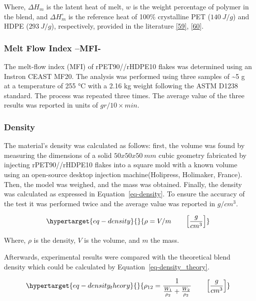 \documentclass[
]{article}
\begin{document}
Where, \(\Delta H_{m}\) is the latent heat of melt, \(w\) is the weight
percentage of polymer in the blend, and \(\Delta H_{m}^\circ\) is the
reference heat of 100\% crystalline PET (\(140~J/g\)) and HDPE
(\(293~J/g\)), respectively, provided in the literature
\protect\hyperlink{ref-pan2020}{{[}59{]}},
\protect\hyperlink{ref-kratofil2006}{{[}60{]}}.

\hypertarget{melt-flow-index-mfi-}{%
\subsubsection{Melt Flow Index --MFI-}\label{melt-flow-index-mfi-}}

The melt-flow index (MFI) of rPET90//rHDPE10 flakes was determined using
an Instron CEAST MF20. The analysis was performed using three samples of
\textasciitilde5 g at a temperature of 255 °C with a 2.16 kg weight
following the ASTM D1238 standard. The process was repeated three times.
The average value of the three results was reported in units of
\(gr/10 \times min\).

\hypertarget{density}{%
\subsubsection{Density}\label{density}}

The material's density was calculated as follows: first, the volume was
found by measuring the dimensions of a solid \(50x50x50~mm\) cubic
geometry fabricated by injecting rPET90//rHDPE10 flakes into a square
mold with a known volume using an open-source desktop injection
machine(Holipress, Holimaker, France). Then, the model was weighed, and
the mass was obtained. Finally, the density was calculated as expressed
in Equation~\ref{eq-density}. To ensure the accuracy of the test it was
performed twice and the average value was reported in \(g/cm^{3}\).

\begin{equation}\protect\hypertarget{eq-density}{}{
\rho = V/m    \qquad \left[ \frac{g}{cm^{3}} \right]
}\label{eq-density}\end{equation}

Where, \(\rho\) is the density, \(V\) is the volume, and \(m\) the mass.

Afterwards, experimental results were compared with the theoretical
blend density which could be calculated by
Equation~\ref{eq-density_theory}.

\begin{equation}\protect\hypertarget{eq-density_theory}{}{
\rho_{12}= \frac{1}{\frac{W_{1}}{\rho_{2}} + \frac{W_{2}}{\rho_{2}}} \qquad \left[ \frac{g}{cm^{3}} \right]                                               
}\label{eq-density_theory}\end{equation}
\end{document}
